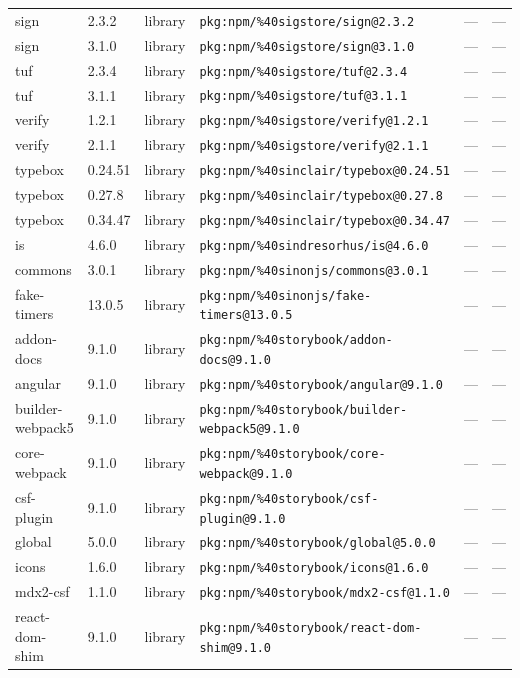 \documentclass[11pt]{article}
\begin{document}
\begin{longtable}{|l|l|l|p{2.2cm}|l|p{4cm}|}
sign & 2.3.2 & library & \texttt{pkg:npm/\%40sigstore/sign@2.3.2} & — & — \\
sign & 3.1.0 & library & \texttt{pkg:npm/\%40sigstore/sign@3.1.0} & — & — \\
tuf & 2.3.4 & library & \texttt{pkg:npm/\%40sigstore/tuf@2.3.4} & — & — \\
tuf & 3.1.1 & library & \texttt{pkg:npm/\%40sigstore/tuf@3.1.1} & — & — \\
verify & 1.2.1 & library & \texttt{pkg:npm/\%40sigstore/verify@1.2.1} & — & — \\
verify & 2.1.1 & library & \texttt{pkg:npm/\%40sigstore/verify@2.1.1} & — & — \\
typebox & 0.24.51 & library & \texttt{pkg:npm/\%40sinclair/typebox@0.24.51} & — & — \\
typebox & 0.27.8 & library & \texttt{pkg:npm/\%40sinclair/typebox@0.27.8} & — & — \\
typebox & 0.34.47 & library & \texttt{pkg:npm/\%40sinclair/typebox@0.34.47} & — & — \\
is & 4.6.0 & library & \texttt{pkg:npm/\%40sindresorhus/is@4.6.0} & — & — \\
commons & 3.0.1 & library & \texttt{pkg:npm/\%40sinonjs/commons@3.0.1} & — & — \\
fake-timers & 13.0.5 & library & \texttt{pkg:npm/\%40sinonjs/fake-timers@13.0.5} & — & — \\
addon-docs & 9.1.0 & library & \texttt{pkg:npm/\%40storybook/addon-docs@9.1.0} & — & — \\
angular & 9.1.0 & library & \texttt{pkg:npm/\%40storybook/angular@9.1.0} & — & — \\
builder-webpack5 & 9.1.0 & library & \texttt{pkg:npm/\%40storybook/builder-webpack5@9.1.0} & — & — \\
core-webpack & 9.1.0 & library & \texttt{pkg:npm/\%40storybook/core-webpack@9.1.0} & — & — \\
csf-plugin & 9.1.0 & library & \texttt{pkg:npm/\%40storybook/csf-plugin@9.1.0} & — & — \\
global & 5.0.0 & library & \texttt{pkg:npm/\%40storybook/global@5.0.0} & — & — \\
icons & 1.6.0 & library & \texttt{pkg:npm/\%40storybook/icons@1.6.0} & — & — \\
mdx2-csf & 1.1.0 & library & \texttt{pkg:npm/\%40storybook/mdx2-csf@1.1.0} & — & — \\
react-dom-shim & 9.1.0 & library & \texttt{pkg:npm/\%40storybook/react-dom-shim@9.1.0} & — & — \\

\end{longtable}
\end{document}
